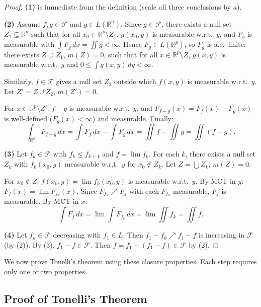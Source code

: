 \documentclass[11pt]{report}
\begin{document}
\begin{proof}
\textbf{(1)} is immediate from the definition (scale all three conclusions by $a$).

\textbf{(2)} Assume $f, g \in \mathcal{F}$ and $g \in L(\mathbb{R}^n)$. Since $g \in \mathcal{F}$, there exists a null set $Z_1 \subseteq \mathbb{R}^p$ such that for all $x_0 \in \mathbb{R}^p \setminus Z_1$, $g(x_0, y)$ is measurable w.r.t.\ $y$, and $F_g$ is measurable with $\int F_g\,dx = \iint g < \infty$. Hence $F_g \in L(\mathbb{R}^p)$, so $F_g$ is a.e.\ finite: there exists $Z \supseteq Z_1$, $m(Z) = 0$, such that for all $x \in \mathbb{R}^p \setminus Z$, $g(x, y)$ is measurable w.r.t.\ $y$ and $0 \leq \int g(x,y)\,dy < \infty$.

Similarly, $f \in \mathcal{F}$ gives a null set $Z_2$ outside which $f(x, y)$ is measurable w.r.t.\ $y$. Let $Z' = Z \cup Z_2$, $m(Z') = 0$.

For $x \in \mathbb{R}^p \setminus Z'$: $f - g$ is measurable w.r.t.\ $y$, and $F_{f-g}(x) = F_f(x) - F_g(x)$ is well-defined ($F_g(x) < \infty$) and measurable. Finally:
\[
\int_{\mathbb{R}^p} F_{f-g}\,dx = \int F_f\,dx - \int F_g\,dx = \iint f - \iint g = \iint (f - g).
\]

\textbf{(3)} Let $f_k \in \mathcal{F}$ with $f_k \leq f_{k+1}$ and $f = \lim f_k$. For each $k$, there exists a null set $Z_k$ with $f_k(x_0, y)$ measurable w.r.t.\ $y$ for $x_0 \notin Z_k$. Let $Z = \bigcup Z_k$, $m(Z) = 0$.

For $x_0 \notin Z$: $f(x_0, y) = \lim f_k(x_0, y)$ is measurable w.r.t.\ $y$. By MCT in $y$: $F_f(x) = \lim F_{f_k}(x)$. Since $F_{f_k} \nearrow F_f$ with each $F_{f_k}$ measurable, $F_f$ is measurable. By MCT in $x$:
\[
\int F_f\,dx = \lim \int F_{f_k}\,dx = \lim \iint f_k = \iint f.
\]

\textbf{(4)} Let $f_k \in \mathcal{F}$ decreasing with $f_1 \in L$. Then $f_1 - f_k \nearrow f_1 - f$ is increasing in $\mathcal{F}$ (by (2)). By (3), $f_1 - f \in \mathcal{F}$. Then $f = f_1 - (f_1 - f) \in \mathcal{F}$ by (2).
\end{proof}

We now prove Tonelli's theorem using these closure properties. Each step requires only one or two properties.

\subsection{Proof of Tonelli's Theorem}
\end{document}
